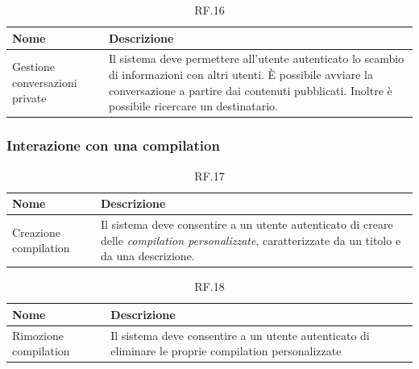 \documentclass{natourDoc}
\begin{document}
\begin{table}[H]
	\centering
	\begin{tabular}{ |p{5cm}|p{10.3cm}| }
		\hline
		\rowcolor{PineGreen!70}
		\textbf{Nome}                  & \textbf{Descrizione}                                                                           \\
		\hline
		Gestione conversazioni private & Il sistema deve permettere all'utente autenticato lo scambio di informazioni con altri utenti.
		È possibile avviare la conversazione a partire dai contenuti pubblicati. Inoltre è possibile ricercare un destinatario.         \\
		\hline
	\end{tabular}
	\caption{RF.16}
	\label{table:16}
\end{table}

\subsubsection{Interazione con una compilation}
\begin{table}[H]
	\centering
	\begin{tabular}{ |p{5cm}|p{10.3cm}| }
		\hline
		\rowcolor{PineGreen!70}
		\textbf{Nome}         & \textbf{Descrizione}                                                                                    \\
		\hline
		Creazione compilation & Il sistema deve consentire a un utente autenticato di creare delle \textit{compilation personalizzate},
		caratterizzate da un titolo e da una descrizione.                                                                               \\
		\hline
	\end{tabular}
	\caption{RF.17}
	\label{table:17}
\end{table}

\begin{table}[H]
	\centering
	\begin{tabular}{ |p{5cm}|p{10.3cm}| }
		\hline
		\rowcolor{PineGreen!70}
		\textbf{Nome}         & \textbf{Descrizione}                                                       \\
		\hline
		Rimozione compilation & Il sistema deve consentire a un utente autenticato di eliminare le proprie
		compilation personalizzate                                                                         \\
		\hline
	\end{tabular}
	\caption{RF.18}
	\label{table:18}
\end{table}
\end{document}
